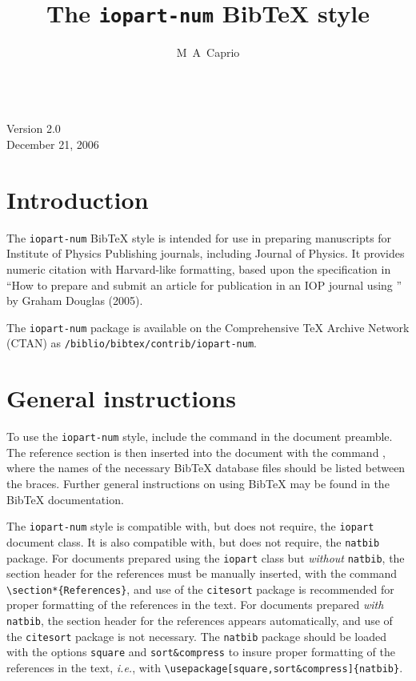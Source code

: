 \documentclass[12pt]{iopart}
\newcommand{\BibTeX}{Bib\TeX}
\begin{document}
\nocite{*}

\title{The \texttt{iopart-num} \BibTeX{} style}

\noindent \qquad \\[-6pt] \qquad Version 2.0\\\qquad December 21, 2006

\author{M~A~Caprio}

\address{Center for Theoretical Physics, Sloane Physics Laboratory,
  Yale University, New Haven, Connecticut 06520-8120, USA}

\section{Introduction}

The \texttt{iopart-num} \BibTeX{} style is intended for use in
preparing manuscripts for Institute of Physics Publishing journals,
including Journal of Physics.  It provides numeric citation with
Harvard-like formatting, based upon the specification in ``How to
prepare and submit an article for publication in an IOP journal using
\LaTeXe'' by Graham Douglas (2005).

The \texttt{iopart-num} package is available on the Comprehensive
\TeX{} Archive Network (CTAN) as \texttt{/biblio/bibtex/contrib/iopart-num}.

\section{General instructions}

To use the \texttt{iopart-num} style, include the command
\verb++ in the
document preamble.  The reference section is then inserted into the
document with the command \verb++, where the names
of the necessary \BibTeX{} database files should be listed between the
braces.  Further general instructions on using \BibTeX{} may be found
in the \BibTeX{} documentation.

The \texttt{iopart-num} style is compatible with, but does not
require, the \texttt{iopart} document class.  It is also compatible
with, but does not require, the \texttt{natbib} package.  For
documents prepared using the \texttt{iopart} class but
\textit{without} \texttt{natbib}, the section header
for the references must be manually inserted, with the command
\verb+\section*{References}+, and use of the \texttt{citesort} package
is recommended for proper formatting of the references in the text.
For documents prepared \textit{with}
\texttt{natbib}, the section header for the references appears automatically,
and use of the \texttt{citesort} package is not necessary.  The
\texttt{natbib} package should be loaded with the options \verb+square+ and \verb+sort&compress+
to insure proper formatting of the references in the text,
\textit{i.e.}, with \verb+\usepackage[square,sort&compress]{natbib}+.
\end{document}
